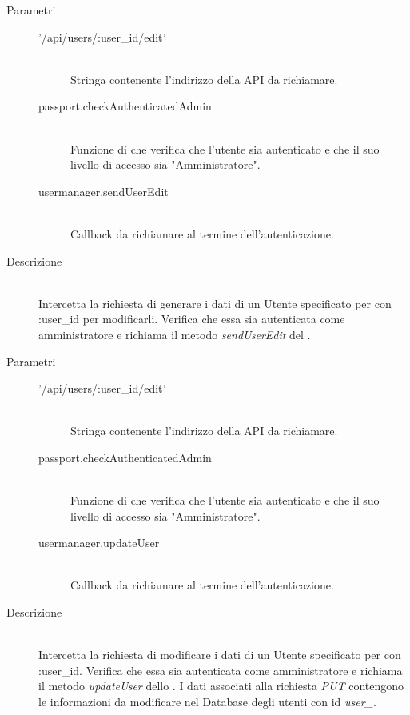 \begin{description}
\begin{description}
\begin{mldescription}
     \hfill 
    \begin{description}
    \item[Parametri] \hfill
     \begin{description}
      \item['/api/users/:user\_id/edit'] \hfill \\
      Stringa contenente l'indirizzo della API da richiamare.
      \item[passport.checkAuthenticatedAdmin] \hfill \\
      Funzione di  che verifica che l'utente sia autenticato e che il suo livello di accesso sia "Amministratore".
      \item[usermanager.sendUserEdit] \hfill \\
      Callback da richiamare al termine dell'autenticazione.
     \end{description}
    \item[Descrizione] \hfill \\
    Intercetta la richiesta di generare i dati di un Utente specificato per con :user\_id per modificarli. Verifica che essa sia autenticata come amministratore e richiama il metodo \textit{sendUserEdit} del .
    \end{description} 
    
     \hfill 
    \begin{description}
    \item[Parametri] \hfill
     \begin{description}
      \item['/api/users/:user\_id/edit'] \hfill \\
      Stringa contenente l'indirizzo della API da richiamare.
      \item[passport.checkAuthenticatedAdmin] \hfill \\
      Funzione di  che verifica che l'utente sia autenticato e che il suo livello di accesso sia "Amministratore".
      \item[usermanager.updateUser] \hfill \\
      Callback da richiamare al termine dell'autenticazione.
     \end{description}
    \item[Descrizione] \hfill \\
    Intercetta la richiesta di modificare i dati di un Utente specificato per con :user\_id. Verifica che essa sia autenticata come amministratore e richiama il metodo \textit{updateUser} dello . I dati associati alla richiesta \textit{PUT} contengono le informazioni da modificare nel Database degli utenti con id \textit{user\_}. 
    \end{description}
    

\end{mldescription}
\end{description}
\end{description}
